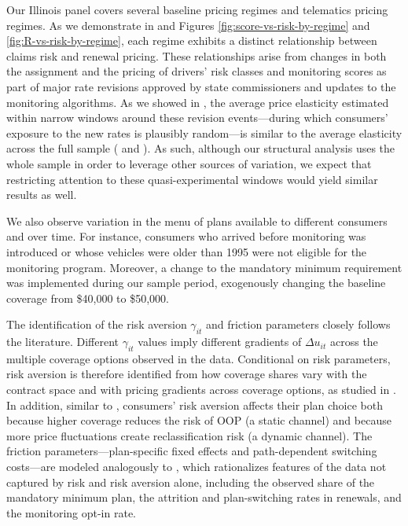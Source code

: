 Our Illinois panel covers several baseline pricing regimes and telematics pricing regimes. As we demonstrate in  and Figures \ref{fig:score-vs-risk-by-regime} and \ref{fig:R-vs-risk-by-regime}, each regime exhibits a distinct relationship between claims risk and renewal pricing. These relationships arise from changes in both the assignment and the pricing of drivers' risk classes and monitoring scores as part of major rate revisions approved by state commissioners and updates to the monitoring algorithms.
As we showed in , the average price elasticity estimated within narrow windows around these revision events---during which consumers' exposure to the new rates is plausibly random---is similar to the average elasticity across the full sample ( and ). As such, although our structural analysis uses the whole sample in order to leverage other sources of variation, we expect that restricting attention to these quasi-experimental windows would yield similar results as well.

We also observe variation in the menu of plans available to different consumers and over time.
For instance, consumers who arrived before monitoring was introduced or whose vehicles were older than 1995 were not eligible for the monitoring program.
Moreover, a change to the mandatory minimum requirement was implemented during our sample period, exogenously changing the baseline coverage from \$40,000 to \$50,000.

The identification of the risk aversion $\gamma_{it}$ and friction parameters closely follows the literature. Different $\gamma_{it}$ values imply different gradients of $\Delta u_{it}$ across the multiple coverage options observed in the data. Conditional on risk parameters, risk aversion is therefore identified from how coverage shares vary with the contract space and with pricing gradients across coverage options, as studied in \textcite{kircher2015inferring, barseghyan2018estimating}. In addition, similar to \textcite{Handel2015}, consumers' risk aversion affects their plan choice both because higher coverage reduces the risk of OOP (a static channel) and because more price fluctuations create reclassification risk (a dynamic channel). The friction parameters---plan-specific fixed effects and path-dependent switching costs---are modeled analogously to \textcite{Handel2013}, which rationalizes features of the data not captured by risk and risk aversion alone, including the observed share of the mandatory minimum plan, the attrition and plan-switching rates in renewals, and the monitoring opt-in rate.

